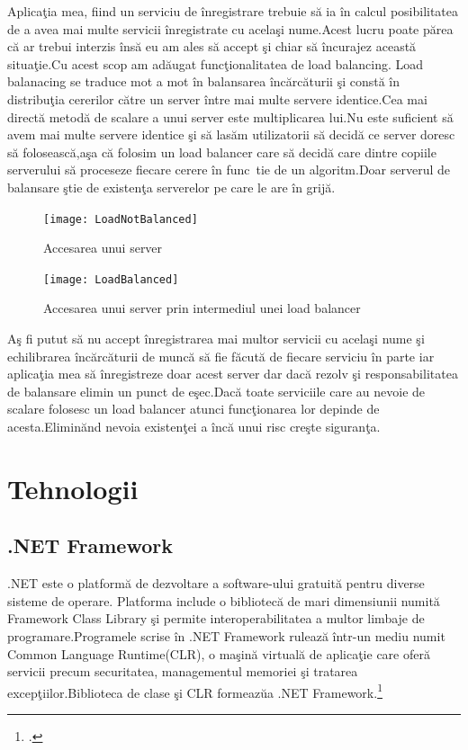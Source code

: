 \documentclass[a4paper,12pt]{report}
\begin{document}
Aplica\c tia mea, fiind un serviciu de \^inregistrare trebuie s\u a ia \^in calcul posibilitatea de a avea mai multe servicii
\^inregistrate cu acela\c si nume.Acest lucru poate p\u area c\u a ar trebui interzis \^ins\u a eu am ales s\u a accept \c si 
chiar s\u a \^incurajez aceast\u a situa\c tie.Cu acest scop am ad\u augat func\c tionalitatea de load balancing.
Load balanacing se traduce mot a mot \^in balansarea \^inc\u arc\u aturii \c si const\u a \^in distribu\c tia cererilor 
c\u atre un server \^intre mai multe servere identice.Cea mai direct\u a metod\u a de scalare a unui server este 
multiplicarea lui.Nu este suficient s\u a avem mai multe servere identice \c si s\u a las\u am utilizatorii s\u a
decid\u a ce server doresc s\u a foloseasc\u a,a\c sa c\u a folosim un load balancer care s\u a decid\u a care dintre
copiile serverului s\u a proceseze fiecare cerere \^in func\ tie de un algoritm.Doar serverul de balansare 
\c stie de existen\c ta serverelor pe care le are \^in grij\u a.
\begin{figure}[!htb]
	\texttt{[image: LoadNotBalanced]}
	\caption{Accesarea unui server}
	\label{fig:notLoadBalanced}
\end{figure}
\begin{figure}[!htb]
	\texttt{[image: LoadBalanced]}
	\caption{Accesarea unui server prin intermediul unei load balancer}
	\label{fig:loadBalanced}
\end{figure}

A\c s fi putut s\u a nu accept \^inregistrarea mai multor servicii cu acela\c si nume \c si echilibrarea \^inc\u arc\u aturii 
de munc\u a s\u a fie f\u acut\u a de fiecare serviciu \^in parte iar aplica\c tia mea s\u a \^inregistreze doar acest server
dar dac\u a rezolv \c si responsabilitatea de balansare elimin un punct de e\c sec.Dac\u a toate serviciile care au nevoie 
de scalare folosesc un load balancer atunci func\c tionarea lor depinde de acesta.Elimin\u and nevoia existen\c tei a \^inc\u a
unui risc cre\c ste siguran\c ta.

\chapter{Tehnologii}

\section{.NET Framework}
.NET este o platform\u a de dezvoltare a software-ului gratuit\u a pentru diverse sisteme de operare.
Platforma include o bibliotec\u a de mari dimensiunii numit\u a Framework Class Library \c si permite interoperabilitatea
a multor limbaje de programare.Programele scrise \^in .NET Framework ruleaz\u a \^intr-un mediu numit
Common Language Runtime(CLR), o ma\c sin\u a virtual\u a de aplica\c tie care ofer\u a servicii precum
securitatea, managementul memoriei \c si tratarea excep\c tiilor.Biblioteca de clase \c si CLR formeaz\u ua 
.NET Framework.\footcite{wikidotNet}
\end{document}
